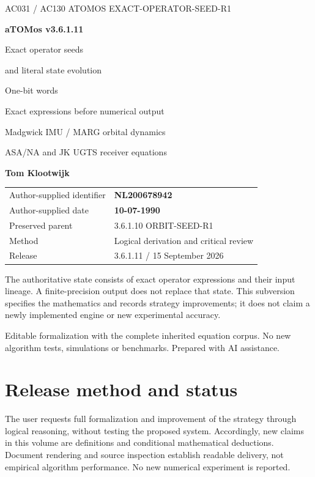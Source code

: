 

\begin{titlepage}\thispagestyle{empty}
{\sffamily\color{accent}\large AC031 / AC130 ATOMOS \hfill EXACT-OPERATOR-SEED-R1}\par
\vspace{18mm}
{\sffamily\bfseries\fontsize{45}{53}\selectfont\color{ink}aTOMos v3.6.1.11}\par
\vspace{10mm}
{\sffamily\fontsize{29}{35}\selectfont Exact operator seeds\par and literal state evolution}\par
\vspace{8mm}
{\sffamily\fontsize{20}{26}\selectfont\color{gold}One-bit words\par Exact expressions before numerical output}\par
\vspace{11mm}
{\large Madgwick IMU / MARG \;\textperiodcentered\; orbital dynamics\par
ASA/NA and JK \;\textperiodcentered\; UGTS \;\textperiodcentered\; receiver equations}\par
\vspace{13mm}
{\sffamily\bfseries\Large Tom Klootwijk}\par
\begin{tabular}{@{}ll@{}}
Author-supplied identifier & \textbf{NL200678942}\\
Author-supplied date & \textbf{10-07-1990}\\
Preserved parent & 3.6.1.10 ORBIT-SEED-R1\\
Method & Logical derivation and critical review\\
Release & 3.6.1.11 / 15 September 2026\\
\end{tabular}
\vfill
\begin{panel}
The authoritative state consists of exact operator expressions and their input
lineage. A finite-precision output does not replace that state. This subversion
specifies the mathematics and records strategy improvements; it does not claim
a newly implemented engine or new experimental accuracy.
\end{panel}
{\small\color{muted}Editable formalization with the complete inherited equation corpus.
No new algorithm tests, simulations or benchmarks. Prepared with AI assistance.}
\end{titlepage}
\setcounter{page}{2}
\section*{Release method and status}
The user requests full formalization and improvement of the strategy through
logical reasoning, without testing the proposed system. Accordingly, new claims
in this volume are definitions and conditional mathematical deductions. Document
rendering and source inspection establish readable delivery, not empirical
algorithm performance. No new numerical experiment is reported.

